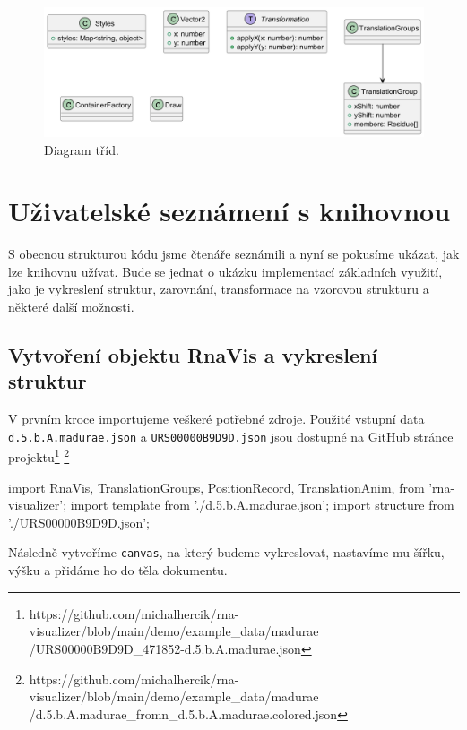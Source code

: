 \begin{figure}[H]
  \centering
  \includegraphics[width=145mm]{../img/kap03/others.png}
  \caption{Diagram tříd.}
\end{figure}

\section{Uživatelské seznámení s knihovnou}

S obecnou strukturou kódu jsme čtenáře seznámili a nyní se pokusíme ukázat, jak
lze knihovnu užívat. Bude se jednat o ukázku implementací základních využití,
jako je vykreslení struktur, zarovnání, transformace na vzorovou strukturu a
některé další možnosti.

\subsection{Vytvoření objektu RnaVis a vykreslení struktur}

V prvním kroce importujeme veškeré potřebné zdroje. Použité vstupní data
\texttt{d.5.b.A.madurae.json} a \texttt{URS00000B9D9D.json} jsou dostupné na
GitHub stránce
projektu\footnote{https://github.com/michalhercik/rna-visualizer/blob/main/demo/example\_data/madurae\\/URS00000B9D9D\_471852-d.5.b.A.madurae.json}
\footnote{https://github.com/michalhercik/rna-visualizer/blob/main/demo/example\_data/madurae\\/d.5.b.A.madurae\_fromn\_d.5.b.A.madurae.colored.json}

\begin{code}
import { 
  RnaVis, 
  TranslationGroups, 
  PositionRecord,
  TranslationAnim,
} from 'rna-visualizer';
import template from './d.5.b.A.madurae.json';
import structure from './URS00000B9D9D.json';
\end{code}

Následně vytvoříme \texttt{canvas}, na který budeme vykreslovat, nastavíme mu
šířku, výšku a přidáme ho do těla dokumentu.

